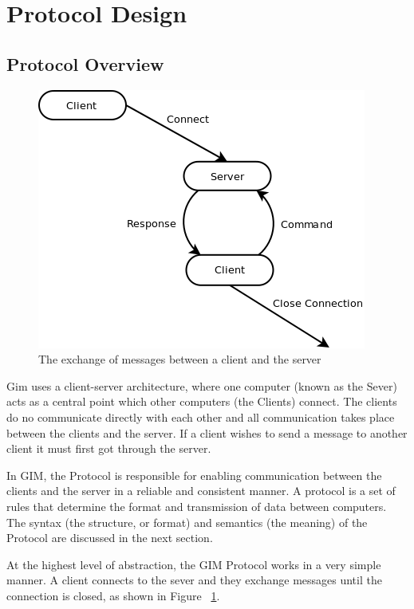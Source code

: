 \section{Protocol Design}

\subsection{Protocol Overview}

\begin{figure}[!h]
    \begin{center}
        \includegraphics[scale=0.65]{chapter2/diagrams/protocol_high_level.png}
        \caption{The exchange of messages between a client and the server}
        \label{highLevelDia}
    \end{center}
\end{figure}

Gim uses a client-server architecture, where one computer (known as the Sever) acts as a central point which other computers (the Clients) connect. The clients do no communicate directly with each other and all communication takes place between the clients and the server. If a client wishes to send a message to another client it must first got through the server.

In GIM, the Protocol is responsible for enabling communication between the clients and the server in a reliable and consistent manner. A protocol is a set of rules that determine the format and transmission of data between computers. The syntax (the structure, or format) and semantics (the meaning) of the Protocol are discussed in the next section.

At the highest level of abstraction, the GIM Protocol works in a very simple manner.  A client connects to the sever and they exchange messages until the connection is closed, as shown in Figure ~\ref{highLevelDia}.

